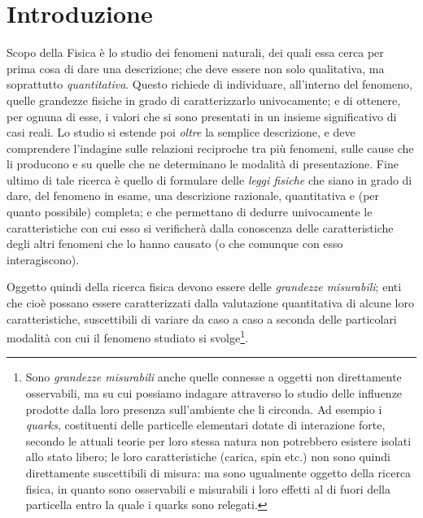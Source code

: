 
\chapter{Introduzione}
Scopo della Fisica \`e lo studio dei fenomeni naturali, dei
quali essa cerca per prima cosa di dare una descrizione; che
deve essere non solo qualitativa, ma soprattutto
\emph{quantitativa}.  Questo richiede di individuare,
all'interno del fenomeno, quelle grandezze fisiche in grado
di caratterizzarlo univocamente; e di ottenere, per ognuna
di esse, i valori che si sono presentati in un insieme
significativo di casi reali.  Lo studio si estende poi
\emph{oltre} la semplice descrizione, e deve comprendere
l'indagine sulle relazioni reciproche tra pi\`u fenomeni,
sulle cause che li producono e su quelle che ne determinano
le modalit\`a di presentazione.  Fine ultimo di tale ricerca
\`e quello di formulare delle \emph{leggi fisiche} che siano
in grado di dare, del fenomeno in esame, una descrizione
razionale, quantitativa e (per quanto possibile) completa; e
che permettano di dedurre univocamente le caratteristiche
con cui esso si verificher\`a dalla conoscenza delle
caratteristiche degli altri fenomeni che lo hanno causato (o
che comunque con esso interagiscono).

Oggetto quindi della ricerca fisica devono essere delle
\emph{grandezze misurabili}; enti che cio\`e possano essere
caratterizzati dalla valutazione quantitativa di alcune loro
caratteristiche, suscettibili di variare da caso a caso a
seconda delle particolari modalit\`a con cui il fenomeno
studiato si svolge\/\footnote{Sono \emph{grandezze
    misurabili} anche quelle connesse a oggetti non
  direttamente osservabili, ma su cui possiamo indagare
  attraverso lo studio delle influenze prodotte dalla loro
  presenza sull'ambiente che li circonda.  Ad esempio i
  \emph{quarks}, costituenti delle particelle elementari
  dotate di interazione forte, secondo le attuali teorie per
  loro stessa natura non potrebbero esistere isolati allo
  stato libero; le loro caratteristiche (carica, spin etc.)
  non sono quindi direttamente suscettibili di misura: ma
  sono ugualmente oggetto della ricerca fisica, in quanto
  sono osservabili e misurabili i loro effetti al di fuori
  della particella entro la quale i quarks sono relegati.}.

